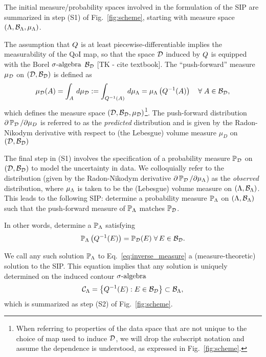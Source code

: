 The initial measure/probability spaces involved in the formulation of the SIP are summarized in step (S1) of Fig.~\ref{fig:scheme}, starting with measure space $({\Lambda}, \mathcal{B}_{{\Lambda}}, \mu_{{\Lambda}})$.

The assumption that $Q$ is at least piecewise-differentiable implies the measurability of the QoI map, so that the space $\mathcal{D}$ induced by $Q$ is equipped with the Borel $\sigma\text{-algebra}$ $\mathcal{B}_{\mathcal{D}}$ [TK - cite textbook].
The ``push-forward'' measure $\mu_{\mathcal{D}}$ on ${(\mathcal{D}, \mathcal{B}_{\mathcal{D}})}$ is defined as 
\begin{equation}\label{eq:dataspace_pushforward_measure}
\mu_{\mathcal{D}} (A) = \int_A \, d\mu_{\mathcal{D}} := \int_{Q^{-1}(A)} \, d\mu_{{\Lambda}} = \mu_{{\Lambda}} \left (Q^{-1}(A) \right ) \quad \forall \;  A\in\mathcal{B}_{\mathcal{D}},
\end{equation}
which defines the measure space $(\mathcal{D}, \mathcal{B}_{\mathcal{D}}, \mu_{\mathcal{D}})$\footnote{When referring to properties of the data space that are not unique to the choice of map used to induce $\mathcal{D}$, we will drop the subscript notation and assume the dependence is understood, as expressed in Fig.~\ref{fig:scheme}.}.
The push-forward distribution $\partial \operatorname*{\mathbb{P}_{\mathcal{D}}} / \partial \mu_D$ is referred to as the \emph{predicted} distribution and is given by the Radon-Nikodym derivative with respect to (the Lebesgue) volume measure $\mu_D$ on ${(\mathcal{D}, \mathcal{B}_{\mathcal{D}})}$ 

The final step in (S1) involves the specification of a probability measure $\operatorname*{\mathbb{P}_{\mathcal{D}}}$ on ${(\mathcal{D}, \mathcal{B}_{\mathcal{D}})}$ to model the uncertainty in data. 
We colloquially refer to the distribution (given by the Radon-Nikodym derivative $\partial \operatorname*{\mathbb{P}_{\mathcal{D}}} / \partial \mu_{{\Lambda}}$) as the \emph{observed} distribution, where $\mu_{{\Lambda}}$ is taken to be the (Lebesgue) volume measure on ${({\Lambda}, \mathcal{B}_{{\Lambda}})}$. 
This leads to the following SIP: determine a probability measure $\operatorname*{\mathbb{P}_{{\Lambda}}}$ on ${({\Lambda}, \mathcal{B}_{{\Lambda}})}$ such that the push-forward measure of $\operatorname*{\mathbb{P}_{{\Lambda}}}$ matches $\operatorname*{\mathbb{P}_{\mathcal{D}}}$. 

In other words, determine a $\operatorname*{\mathbb{P}_{{\Lambda}}}$ satisfying
\begin{equation}\label{eq:inverse_measure}
\operatorname*{\mathbb{P}_{{\Lambda}}} \left ( Q^{-1}(E)\right ) = \mathbb{P}_{\mathcal{D}}(E) \; \forall \, E \in \mathcal{B}_{\mathcal{D}}.
\end{equation}

We call any such solution $\operatorname*{\mathbb{P}_{{\Lambda}}}$ to Eq.~\eqref{eq:inverse_measure} a (measure-theoretic) solution to the SIP.
This equation implies that any solution is uniquely determined on the induced contour $\sigma\text{-algebra}$ 
\begin{equation}\label{eq:contour_sa}
\mathcal{C}_{{\Lambda}} = \left\{Q^{-1}(E) : E \in \mathcal{B}_{\mathcal{D}} \right\} \subset \mathcal{B}_{{\Lambda}},
\end{equation}
which is summarized as step (S2) of Fig.~\ref{fig:scheme}. 

